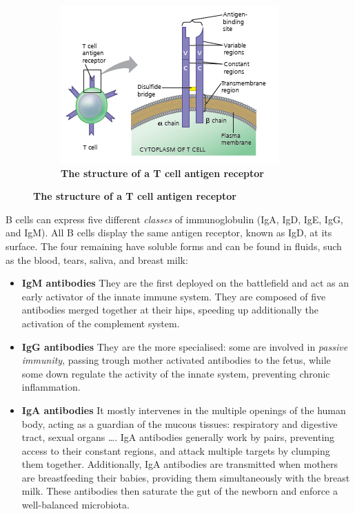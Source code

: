 {{\begin{figure}
\begin{subfigure}[b]{0.45\textwidth}
         \includegraphics[width=\textwidth]{figures/T-cell-receptor.png}
         \caption{\textbf{The structure of a T cell antigen receptor}}
         \label{fig:T-cell-receptor}
     \end{subfigure}
\end{figure}
B cells can express five different \textit{classes} of immunoglobulin
(IgA, IgD, IgE, IgG, and IgM). All B cells display the same antigen receptor, known as IgD, at its surface. The four remaining have soluble forms and can be found in fluids, such as the blood, tears, saliva, and breast milk:
\begin{itemize}
    \item \textbf{IgM antibodies} They are the first deployed on the battlefield and act as an early activator of the innate immune system. They are composed of five antibodies merged together at their hips, speeding up additionally the activation of the complement system.
    \item \textbf{IgG antibodies} They are the more specialised: some are involved in \textit{passive immunity}, passing trough mother activated antibodies to the fetus, while some down regulate the activity of the innate system, preventing chronic inflammation. 
    \item \textbf{IgA antibodies} It mostly intervenes in the multiple openings of the human body, acting as a guardian of the mucous tissues: respiratory and digestive tract, sexual organs \ldots. IgA antibodies generally work by pairs, preventing access to their constant regions, and attack multiple targets by clumping them together.    
    Additionally, IgA antibodies are transmitted when mothers are breastfeeding their babies, providing them simultaneously with the breast milk. These antibodies then saturate the gut of the newborn and enforce a well-balanced microbiota.

\end{itemize}}}

